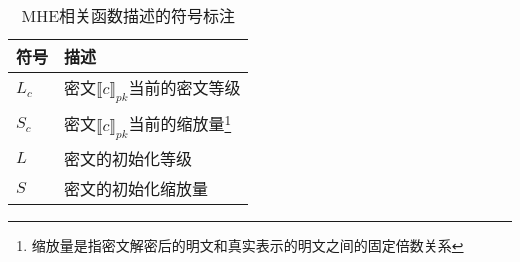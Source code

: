 \begin{table}[htbp]
	\centering
	\begin{minipage}[t]{0.6\linewidth}
		\caption{MHE相关函数描述的符号标注}
		\label{tab:symbol}
		\begin{tabular*}{\linewidth}{lp{10cm}}
			\toprule[1.5pt]
			{\hei 符号} & {\hei 描述}\\
			\midrule[1pt]
			$L_c$ & 密文$\llbracket c\rrbracket_{pk}$当前的密文等级 \\ 
			$S_c$ & 密文$\llbracket c\rrbracket_{pk}$当前的缩放量\footnote{缩放量是指密文解密后的明文和真实表示的明文之间的固定倍数关系} \\
			$L$ & 密文的初始化等级\\
			$S$ & 密文的初始化缩放量\\
			\bottomrule[1.5pt]
		\end{tabular*}
	\end{minipage}
\end{table}

